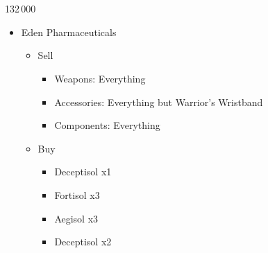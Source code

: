 \chapter[Chapter 13]{}
\begin{multicols}{2}
\begin{shop}{132\,000}
\begin{itemize}
    \item Eden Pharmaceuticals
    \begin{itemize}
        \item Sell
        \begin{itemize}
            \item Weapons: Everything
            \item Accessories: Everything but Warrior's Wristband
            \item Components: Everything
        \end{itemize}
        \item Buy
        \begin{itemize}
            \item Deceptisol x1
            \item Fortisol x3
            \item Aegisol x3
            \item Deceptisol x2
        \end{itemize}
    \end{itemize}
\end{itemize}
\end{shop}


\end{multicols}
